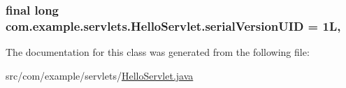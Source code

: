 \subsubsection[{serial\+Version\+U\+I\+D}]{\setlength{\rightskip}{0pt plus 5cm}final long com.\+example.\+servlets.\+Hello\+Servlet.\+serial\+Version\+U\+I\+D = 1\+L\hspace{0.3cm}{\ttfamily [static]}, {\ttfamily [private]}}\label{classcom_1_1example_1_1servlets_1_1_hello_servlet_aee3a8f698be2149a6d0c401ab648cf82}


The documentation for this class was generated from the following file\+:\begin{DoxyCompactItemize}
\item 
src/com/example/servlets/\hyperlink{_hello_servlet_8java}{Hello\+Servlet.\+java}\end{DoxyCompactItemize}
